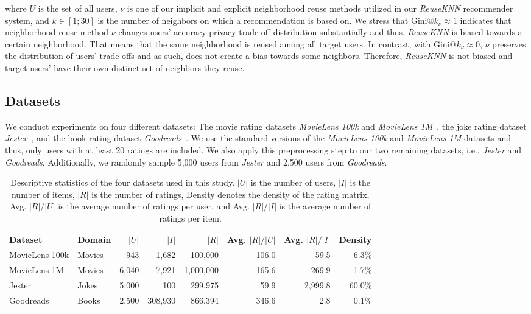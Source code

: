 \documentclass[manuscript,review,anonymous]{acmart}
\begin{document}
where $U$ is the set of all users, $\nu$ is one of our implicit and explicit neighborhood reuse methods utilized in our \emph{ReuseKNN} recommender system, and $k \in [1;30]$ is the number of neighbors on which a recommendation is based on. 
We stress that $\mathrm{Gini}@k_\nu \approx 1$ indicates that neighborhood reuse method $\nu$ changes users' accuracy-privacy trade-off distribution substantially and thus, \emph{ReuseKNN} is biased towards a certain neighborhood.
That means that the same neighborhood is reused among all target users.
In contrast, with $\mathrm{Gini}@k_\nu \approx 0$, $\nu$ preserves the distribution of users' trade-offs and as such, does not create a bias towards some neighbors. 
Therefore, \emph{ReuseKNN} is not biased and target users' have their own distinct set of neighbors they reuse.

\subsection{Datasets}
We conduct experiments on four different datasets: The movie rating datasets \emph{MovieLens 100k} and \emph{MovieLens 1M}~\cite{harper2015movielens}, the joke rating dataset \emph{Jester}~\cite{goldberg2001eigentaste}, and the book rating dataset \emph{Goodreads}~\cite{DBLP:conf/recsys/WanM18,DBLP:conf/acl/WanMNM19}.
We use the standard versions of the \emph{MovieLens 100k} and \emph{MovieLens 1M} datasets and thus, only users with at least 20 ratings are included. We also apply this preprocessing step to our two remaining datasets, i.e., \emph{Jester} and \emph{Goodreads}.
Additionally, we randomly sample 5,000 users from \emph{Jester} and 2,500 users from \emph{Goodreads}.

\begin{table}[!t]
    \centering
    \begin{tabular}{l@{\hskip .6cm} l@{\hskip .3cm} |@{\hskip .3cm} r@{\hskip .6cm} r@{\hskip .6cm} r@{\hskip .6cm} r@{\hskip .6cm} r@{\hskip .6cm} r}
        \toprule
        Dataset & Domain & $|U|$ & $|I|$ & $|R|$ & Avg. $|R| / |U|$ &  Avg. $|R| / |I|$  & Density \\ \midrule
        MovieLens 100k & Movies & 943 & 1,682 & 100,000 & 106.0 & 59.5 & 6.3\% \\
        MovieLens 1M & Movies & 6,040 & 7,921 & 1,000,000 & 165.6 & 269.9 & 1.7\% \\
        Jester & Jokes & 5,000 & 100 & 299,975 & 59.9 & 2,999.8 & 60.0\% \\
        Goodreads & Books & 2,500 & 308,930 & 866,394 & 346.6 & 2.8 & 0.1\% \\ \bottomrule
    \end{tabular}
    \caption{Descriptive statistics of the four datasets used in this study. $|U|$ is the number of users, $|I|$ is the number of items, $|R|$ is the number of ratings, Density denotes the density of the rating matrix, Avg. $|R| / |U|$ is the average number of ratings per user, and Avg. $|R| / |I|$ is the average number of ratings per item.}
    \label{tab:datasets}
\end{table}
\end{document}
